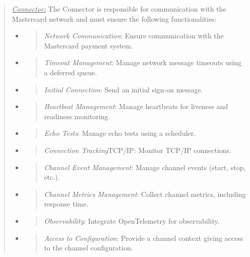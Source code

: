 \documentclass[12pt,a4paper]{report}
\begin{document}
\begin{quote}
\emph{\uline{Connector:}}
The Connector is responsible for communication with the Mastercard
network and must ensure the following functionalities:
\begin{itemize}
\item
  \begin{quote}
  \emph{Network Communication}: Ensure communication with the Mastercard
  payment system.
  \end{quote}
\item
  \begin{quote}
  \emph{Timeout Management}: Manage network message timeouts using a
  deferred queue.
  \end{quote}
\item
  \begin{quote}
  \emph{Initial Connection}: Send an initial sign-on message.
  \end{quote}
\item
  \begin{quote}
  \emph{Heartbeat Management}: Manage heartbeats for liveness and
  readiness monitoring.
  \end{quote}
\item
  \begin{quote}
  \emph{Echo Tests}: Manage echo tests using a scheduler.
  \end{quote}
\item
  \begin{quote}
  \emph{Connection Tracking}TCP/IP: Monitor TCP/IP connections.
  \end{quote}
\item
  \begin{quote}
  \emph{Channel Event Management}: Manage channel events (start, stop,
  etc.).
  \end{quote}
\item
  \begin{quote}
  \emph{Channel Metrics Management}: Collect channel metrics, including
  response time.
  \end{quote}
\item
  \begin{quote}
  \emph{Observability}: Integrate OpenTelemetry for observability.
  \end{quote}
\item
  \begin{quote}
  \emph{Access to Configuration}: Provide a channel context giving
  access to the channel configuration.
  \end{quote}

\end{itemize}
\end{quote}
\end{document}
